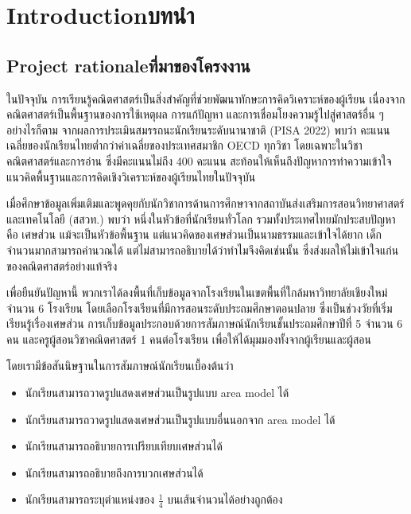 \chapter{\ifenglish Introduction\else บทนำ\fi}

\section{\ifenglish Project rationale\else ที่มาของโครงงาน\fi}
ในปัจจุบัน การเรียนรู้คณิตศาสตร์เป็นสิ่งสำคัญที่ช่วยพัฒนาทักษะการคิดวิเคราะห์ของผู้เรียน เนื่องจากคณิตศาสตร์เป็นพื้นฐานของการใช้เหตุผล การแก้ปัญหา 
และการเชื่อมโยงความรู้ไปสู่ศาสตร์อื่น ๆ อย่างไรก็ตาม จากผลการประเมินสมรรถนะนักเรียนระดับนานาชาติ (PISA 2022) พบว่า 
คะแนนเฉลี่ยของนักเรียนไทยต่ำกว่าค่าเฉลี่ยของประเทศสมาชิก OECD ทุกวิชา โดยเฉพาะในวิชาคณิตศาสตร์และการอ่าน ซึ่งมีคะแนนไม่ถึง 400 คะแนน 
สะท้อนให้เห็นถึงปัญหาการทำความเข้าใจแนวคิดพื้นฐานและการคิดเชิงวิเคราะห์ของผู้เรียนไทยในปัจจุบัน

เมื่อศึกษาข้อมูลเพิ่มเติมและพูดคุยกับนักวิชาการด้านการศึกษาจากสถาบันส่งเสริมการสอนวิทยาศาสตร์และเทคโนโลยี (สสวท.) พบว่า หนึ่งในหัวข้อที่นักเรียนทั่วโลก 
รวมทั้งประเทศไทยมักประสบปัญหาคือ เศษส่วน แม้จะเป็นหัวข้อพื้นฐาน แต่แนวคิดของเศษส่วนเป็นนามธรรมและเข้าใจได้ยาก เด็กจำนวนมากสามารถคำนวณได้ 
แต่ไม่สามารถอธิบายได้ว่าทำไมจึงคิดเช่นนั้น ซึ่งส่งผลให้ไม่เข้าใจแก่นของคณิตศาสตร์อย่างแท้จริง

เพื่อยืนยันปัญหานี้ พวกเราได้ลงพื้นที่เก็บข้อมูลจากโรงเรียนในเขตพื้นที่ใกล้มหาวิทยาลัยเชียงใหม่ จำนวน 6 โรงเรียน โดยเลือกโรงเรียนที่มีการสอนระดับประถมศึกษาตอนปลาย 
ซึ่งเป็นช่วงวัยที่เริ่มเรียนรู้เรื่องเศษส่วน การเก็บข้อมูลประกอบด้วยการสัมภาษณ์นักเรียนชั้นประถมศึกษาปีที่ 5 จำนวน 6 คน และครูผู้สอนวิชาคณิตศาสตร์ 1 คนต่อโรงเรียน 
เพื่อให้ได้มุมมองทั้งจากผู้เรียนและผู้สอน

โดยเรามีข้อสันนิษฐานในการสัมภาษณ์นักเรียนเบื้องต้นว่า
\begin{itemize}
    \item นักเรียนสามารถวาดรูปแสดงเศษส่วนเป็นรูปแบบ area model ได้
    \item นักเรียนสามารถวาดรูปแสดงเศษส่วนเป็นรูปแบบอื่นนอกจาก area model ได้
    \item นักเรียนสามารถอธิบายการเปรียบเทียบเศษส่วนได้
    \item นักเรียนสามารถอธิบายถึงการบวกเศษส่วนได้
    \item นักเรียนสามารถระบุตำแหน่งของ $\frac{1}{4}$ บนเส้นจำนวนได้อย่างถูกต้อง
\end{itemize}

